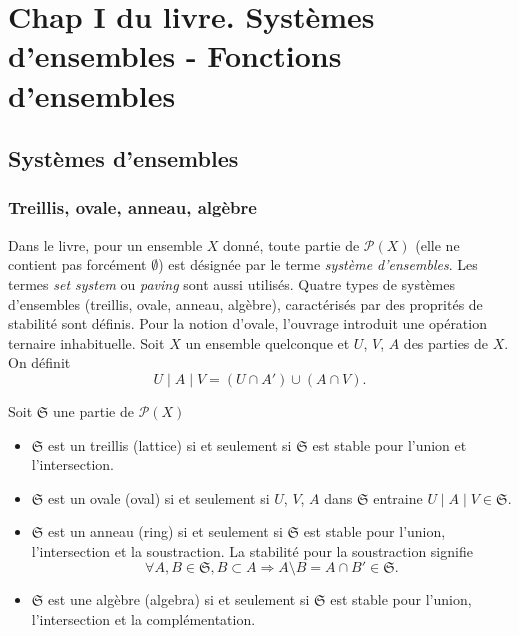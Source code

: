 \section{Chap I du livre. Systèmes d'ensembles - Fonctions d'ensembles}\label{SystFoncEns}
\subsection{Systèmes d'ensembles}\label{SystEns}
\subsubsection{Treillis, ovale, anneau, algèbre}
Dans le livre, pour un ensemble $X$ donné, toute partie de $\mathcal{P}(X)$ (elle ne contient pas forcément $\emptyset$) est désignée par le terme \emph{système d'ensembles}. Les termes \emph{set system} ou \emph{paving} sont aussi utilisés. Quatre types de systèmes d'ensembles (treillis, ovale, anneau, algèbre), caractérisés par des proprités de stabilité sont définis. Pour la notion d'ovale, l'ouvrage introduit une opération ternaire inhabituelle.\newline
Soit $X$ un ensemble quelconque et $U$, $V$, $A$ des parties de $X$. On définit
\begin{displaymath}
  U \mid A \mid V = (U \cap A') \cup ( A \cap V).
\end{displaymath}
\begin{defi}
  Soit $\mathfrak{S}$ une partie de $\mathcal{P}(X)$
  \begin{itemize}
    \item $\mathfrak{S}$ est un treillis (lattice) si et seulement si $\mathfrak{S}$ est stable pour l'union et l'intersection.
    \item $\mathfrak{S}$ est un ovale (oval) si et seulement si $U$, $V$, $A$ dans $\mathfrak{S}$ entraine $U \mid A \mid V \in \mathfrak{S}$.
    \item $\mathfrak{S}$ est un anneau (ring) si et seulement si $\mathfrak{S}$ est stable pour l'union, l'intersection et la soustraction. La stabilité pour la soustraction signifie
    \begin{displaymath}
      \forall A, B \in \mathfrak{S}, B \subset A \Rightarrow A \setminus B = A \cap B' \in \mathfrak{S}.
    \end{displaymath}  
    \item $\mathfrak{S}$ est une algèbre (algebra) si et seulement si $\mathfrak{S}$ est stable pour l'union, l'intersection et la complémentation. 
  \end{itemize}
\end{defi}

